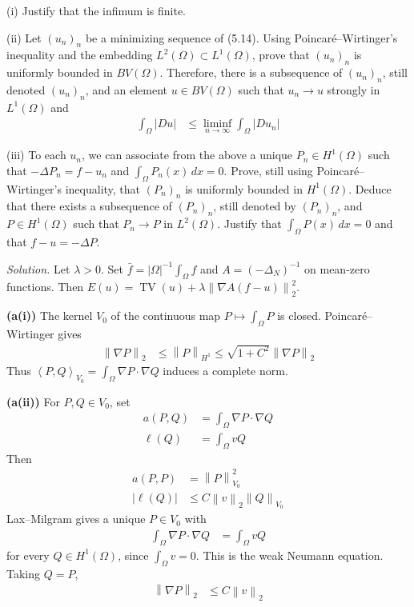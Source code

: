 \documentclass[12pt,letterpaper]{article}
\newcommand{\TV}{\operatorname{TV}}
\newcommand{\norm}[1]{\left\lVert #1\right\rVert}
\newcommand{\ip}[2]{\left\langle #1,#2\right\rangle}
\newenvironment{statement}{\itshape\ignorespaces}{\par}
\newcommand{\solution}{\par\medskip\noindent\textit{Solution.}\enspace}
\newcommand{\partlabel}[1]{\par\medskip\noindent\textbf{(#1)}\enspace}
\begin{document}
\begin{statement}
\par\smallskip
(i) Justify that the infimum is finite.
\par\smallskip
(ii) Let $(u_n)_n$ be a minimizing sequence of (5.14). Using
Poincar\'e--Wirtinger's inequality and the embedding
$L^2(\Omega)\subset L^1(\Omega)$, prove that $(u_n)_n$ is uniformly
bounded in $BV(\Omega)$. Therefore, there is a subsequence of
$(u_n)_n$, still denoted $(u_n)_n$, and an element $u\in BV(\Omega)$
such that $u_n\to u$ strongly in $L^1(\Omega)$ and
\begin{align*}
 \int_\Omega|Du|&\leq\liminf_{n\to\infty}\int_\Omega|Du_n|
\end{align*}
\par\smallskip
(iii) To each $u_n$, we can associate from the above a unique
$P_n\in H^1(\Omega)$ such that $-\Delta P_n=f-u_n$ and
$\int_\Omega P_n(x)\,dx=0$. Prove, still using
Poincar\'e--Wirtinger's inequality, that $(P_n)_n$ is uniformly
bounded in $H^1(\Omega)$. Deduce that there exists a subsequence
of $(P_n)_n$, still denoted by $(P_n)_n$, and $P\in H^1(\Omega)$
such that $P_n\to P$ in $L^2(\Omega)$. Justify that
$\int_\Omega P(x)\,dx=0$ and that $f-u=-\Delta P$.
\end{statement}

\solution
Let $\lambda>0$. Set $\bar f=|\Omega|^{-1}\int_\Omega f$ and
$A=(-\Delta_N)^{-1}$ on mean-zero functions. Then
$E(u)=\TV(u)+\lambda\norm{\nabla A(f-u)}_2^2$.

\partlabel{a(i)}
The kernel $V_0$ of the continuous map $P\mapsto\int_\Omega P$
is closed. Poincar\'e--Wirtinger gives
\begin{align*}
 \norm{\nabla P}_2&\leq\norm P_{H^1}
       \leq\sqrt{1+C^2}\norm{\nabla P}_2
\end{align*}
Thus $\ip PQ_{V_0}=\int_\Omega\nabla P\cdot\nabla Q$ induces a complete norm.

\partlabel{a(ii)}
For $P,Q\in V_0$, set
\begin{align*}
 a(P,Q)&=\int_\Omega\nabla P\cdot\nabla Q\\
 \ell(Q)&=\int_\Omega vQ
\end{align*}
Then
\begin{align*}
 a(P,P)&=\norm P_{V_0}^2\\
 |\ell(Q)|&\leq C\norm v_2\norm Q_{V_0}
\end{align*}
Lax--Milgram gives a unique $P\in V_0$ with
\begin{align*}
 \int_\Omega\nabla P\cdot\nabla Q&=\int_\Omega vQ
\end{align*}
for every $Q\in H^1(\Omega)$, since $\int_\Omega v=0$.
This is the weak Neumann equation. Taking $Q=P$,
\begin{align*}
 \norm{\nabla P}_2&\leq C\norm v_2
\end{align*}
\end{document}
